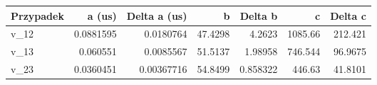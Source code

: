 \begin{tabular}{lrrrrrr}
\hline
 Przypadek   &    a (us) &   Delta a (us) &       b &   Delta b &        c &   Delta c \\
\hline
 v\_12        & 0.0881595 &     0.0180764  & 47.4298 &  4.2623   & 1085.66  &  212.421  \\
 v\_13        & 0.060551  &     0.0085567  & 51.5137 &  1.98958  &  746.544 &   96.9675 \\
 v\_23        & 0.0360451 &     0.00367716 & 54.8499 &  0.858322 &  446.63  &   41.8101 \\
\hline
\end{tabular}